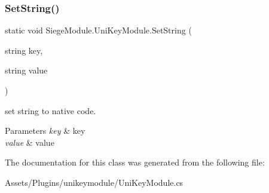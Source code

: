\subsubsection{\texorpdfstring{Set\+String()}{SetString()}}
{\footnotesize\ttfamily static void Siege\+Module.\+Uni\+Key\+Module.\+Set\+String (\begin{DoxyParamCaption}\item[{string}]{key,  }\item[{string}]{value }\end{DoxyParamCaption})\hspace{0.3cm}{\ttfamily [static]}}



set string to native code. 


\begin{DoxyParams}{Parameters}
{\em key} & key\\
\hline
{\em value} & value\\
\hline
\end{DoxyParams}


The documentation for this class was generated from the following file\+:\begin{DoxyCompactItemize}
\item 
Assets/\+Plugins/unikeymodule/Uni\+Key\+Module.\+cs\end{DoxyCompactItemize}
